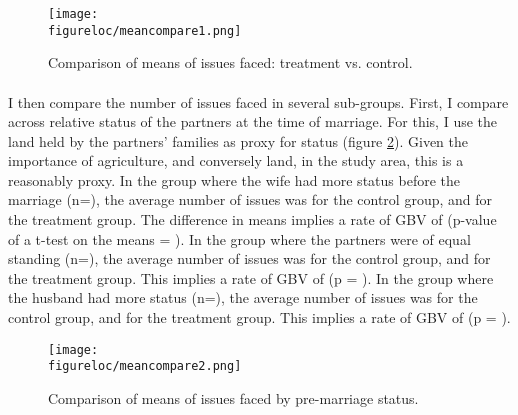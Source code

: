 \documentclass[11pt,a4paper]{scrartcl} %
\newcommand{\figureloc}{C:/Users/Koen/Dropbox/PhD/Papers/CongoGBV/Figures}
\begin{document}
\begin{figure}
  \texttt{[image: \\figureloc/meancompare1.png]}
  \caption{Comparison of means of issues faced: treatment vs. control.}
  \label{fig:meancompare1}
\end{figure}

\paragraph{}
I then compare the number of issues faced in several sub-groups. First, I compare across relative status of the partners at the time of marriage. For this, I use the land held by the partners' families as proxy for status (figure \ref{fig:meancompare2}). Given the importance of agriculture, and conversely land, in the study area, this is a reasonably proxy. In the group where the wife had more status before the marriage (n=), the average number of issues was  for the control group, and  for the treatment group. The difference in means implies a rate of GBV of  (p-value of a t-test on the means = ). In the group where the partners were of equal standing (n=), the average number of issues was  for the control group, and  for the treatment group. This implies a rate of GBV of  (p = ). In the group where the husband had more status (n=), the average number of issues was  for the control group, and  for the treatment group. This implies a rate of GBV of  (p = ).

\begin{figure}
  \texttt{[image: \\figureloc/meancompare2.png]}
  \caption{Comparison of means of issues faced by pre-marriage status.}
  \label{fig:meancompare2}
\end{figure}
\end{document}
